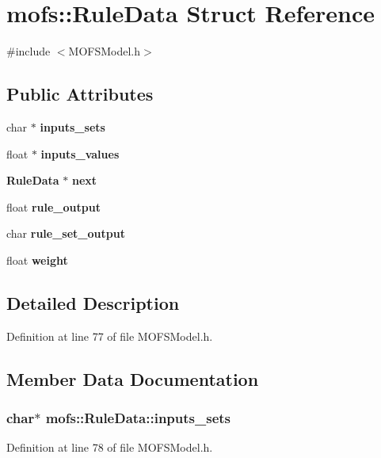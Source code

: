 \section{mofs\-:\-:Rule\-Data Struct Reference}
\label{structmofs_1_1RuleData}


{\ttfamily \#include $<$M\-O\-F\-S\-Model.\-h$>$}

\subsection*{Public Attributes}
\begin{DoxyCompactItemize}
\item 
char $\ast$ {\bf inputs\-\_\-sets}
\item 
float $\ast$ {\bf inputs\-\_\-values}
\item 
{\bf Rule\-Data} $\ast$ {\bf next}
\item 
float {\bf rule\-\_\-output}
\item 
char {\bf rule\-\_\-set\-\_\-output}
\item 
float {\bf weight}
\end{DoxyCompactItemize}


\subsection{Detailed Description}


Definition at line 77 of file M\-O\-F\-S\-Model.\-h.



\subsection{Member Data Documentation}
\subsubsection[{inputs\-\_\-sets}]{\setlength{\rightskip}{0pt plus 5cm}char$\ast$ mofs\-::\-Rule\-Data\-::inputs\-\_\-sets}\label{structmofs_1_1RuleData_a11c654c99b4f999ba7dc822019bff776}


Definition at line 78 of file M\-O\-F\-S\-Model.\-h.

